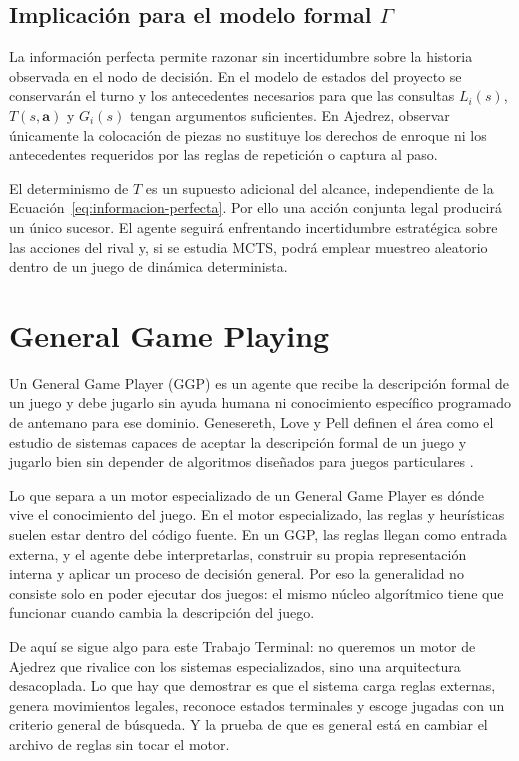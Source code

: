 \subsection{Implicación para el modelo formal \texorpdfstring{$\Gamma$}{Gamma}}
\label{subsec:implicacion_modelo}

La información perfecta permite razonar sin incertidumbre sobre la historia observada en el nodo de decisión. En el modelo de estados del proyecto se conservarán el turno y los antecedentes necesarios para que las consultas $L_i(s)$, $T(s,\mathbf a)$ y $G_i(s)$ tengan argumentos suficientes. En Ajedrez, observar únicamente la colocación de piezas no sustituye los derechos de enroque ni los antecedentes requeridos por las reglas de repetición o captura al paso.

El determinismo de $T$ es un supuesto adicional del alcance, independiente de la Ecuación~\eqref{eq:informacion-perfecta}. Por ello una acción conjunta legal producirá un único sucesor. El agente seguirá enfrentando incertidumbre estratégica sobre las acciones del rival y, si se estudia MCTS, podrá emplear muestreo aleatorio dentro de un juego de dinámica determinista.

\section{General Game Playing}

Un General Game Player (GGP) es un agente que recibe la descripción formal de un juego y debe jugarlo sin ayuda humana ni conocimiento específico programado de antemano para ese dominio. Genesereth, Love y Pell definen el área como el estudio de sistemas capaces de aceptar la descripción formal de un juego y jugarlo bien sin depender de algoritmos diseñados para juegos particulares \cite{Genesereth2005GGP}.

Lo que separa a un motor especializado de un General Game Player es dónde vive el conocimiento del juego. En el motor especializado, las reglas y heurísticas suelen estar dentro del código fuente. En un GGP, las reglas llegan como entrada externa, y el agente debe interpretarlas, construir su propia representación interna y aplicar un proceso de decisión general. Por eso la generalidad no consiste solo en poder ejecutar dos juegos: el mismo núcleo algorítmico tiene que funcionar cuando cambia la descripción del juego.

De aquí se sigue algo para este Trabajo Terminal: no queremos un motor de Ajedrez que rivalice con los sistemas especializados, sino una arquitectura desacoplada. Lo que hay que demostrar es que el sistema carga reglas externas, genera movimientos legales, reconoce estados terminales y escoge jugadas con un criterio general de búsqueda. Y la prueba de que es general está en cambiar el archivo de reglas sin tocar el motor.

